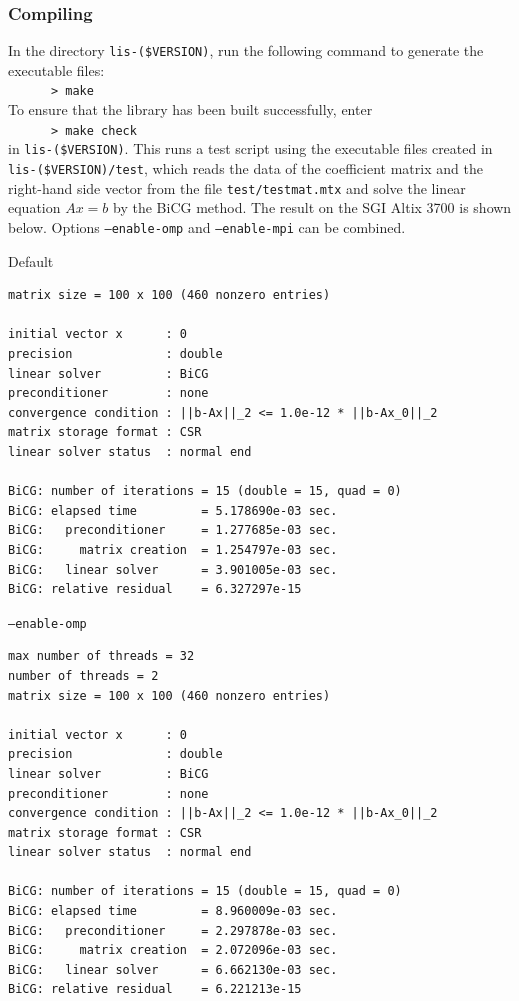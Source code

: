 \documentclass[a4paper]{article}
\begin{document}
\subsubsection{Compiling}
In the directory {\tt lis-(\$VERSION)}, run the following command to generate
the executable files: \\
 \verb+      > make +\\
To ensure that the library has been built successfully, enter 
\\
 \verb+      > make check+\\
in {\tt lis-(\$VERSION)}. 
This runs a test script using the executable files created 
in {\tt lis-(\$VERSION)/test}, which reads 
the data of the coefficient matrix and the right-hand side vector 
from the file 
{\tt test/testmat.mtx} and solve the linear equation $Ax = b$ 
by the BiCG method. The result on the SGI Altix 3700 is
 shown below. Options {\tt --enable-omp} and {\tt --enable-mpi} can be combined.
\begin{itemsquarebox}[l]{Default}
 \begin{minipage}{10cm}
 \begin{verbatim}
matrix size = 100 x 100 (460 nonzero entries)

initial vector x      : 0
precision             : double
linear solver         : BiCG
preconditioner        : none
convergence condition : ||b-Ax||_2 <= 1.0e-12 * ||b-Ax_0||_2
matrix storage format : CSR
linear solver status  : normal end

BiCG: number of iterations = 15 (double = 15, quad = 0)
BiCG: elapsed time         = 5.178690e-03 sec.
BiCG:   preconditioner     = 1.277685e-03 sec. 
BiCG:     matrix creation  = 1.254797e-03 sec.
BiCG:   linear solver      = 3.901005e-03 sec.
BiCG: relative residual    = 6.327297e-15
 \end{verbatim}
 \end{minipage}
\end{itemsquarebox}
\begin{itemsquarebox}[l]{{\tt --enable-omp}}
 \begin{minipage}{10cm}
 \begin{verbatim}
max number of threads = 32
number of threads = 2
matrix size = 100 x 100 (460 nonzero entries)

initial vector x      : 0
precision             : double
linear solver         : BiCG
preconditioner        : none
convergence condition : ||b-Ax||_2 <= 1.0e-12 * ||b-Ax_0||_2
matrix storage format : CSR
linear solver status  : normal end

BiCG: number of iterations = 15 (double = 15, quad = 0)
BiCG: elapsed time         = 8.960009e-03 sec.
BiCG:   preconditioner     = 2.297878e-03 sec. 
BiCG:     matrix creation  = 2.072096e-03 sec.
BiCG:   linear solver      = 6.662130e-03 sec.
BiCG: relative residual    = 6.221213e-15
 \end{verbatim}
 \end{minipage}
\end{itemsquarebox}
\end{document}

